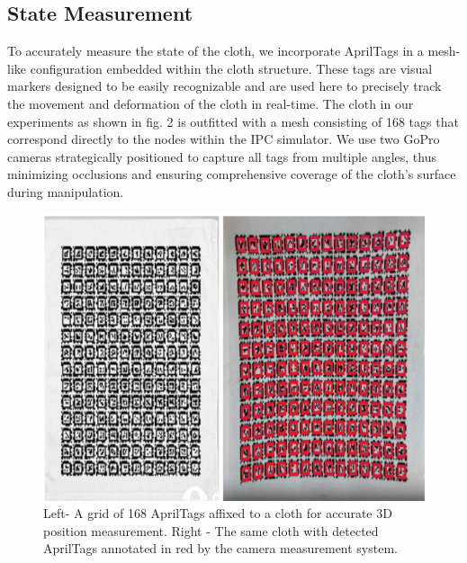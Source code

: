 \documentclass[subscriptcorrection,upint,varvw,barcolor=Goldenrod3,mathalfa=cal=euler,balance,hyphenate,french,pdf-a, nofoot]{asmejour} %
\begin{document}
\subsection{State Measurement}
To accurately measure the state of the cloth, we incorporate AprilTags in a mesh-like configuration embedded within the cloth structure. These tags are visual markers designed to be easily recognizable and are used here to precisely track the movement and deformation of the cloth in real-time. The cloth in our experiments as shown in fig. 2 is outfitted with a mesh consisting of 168 tags that correspond directly to the nodes within the IPC simulator. We use two GoPro cameras strategically positioned to capture all tags from multiple angles, thus minimizing occlusions and ensuring comprehensive coverage of the cloth's surface during manipulation.
\begin{figure}[ht]
\centering
\includegraphics[width=\linewidth]{CLOTH REPORT PICS/Tags.png} %
\caption{Left- A grid of 168 AprilTags affixed to a cloth for accurate 3D position measurement. Right - The same cloth with detected AprilTags annotated in red by the camera measurement system.}
\label{fig:yourlabel}
\end{figure}
\end{document}
